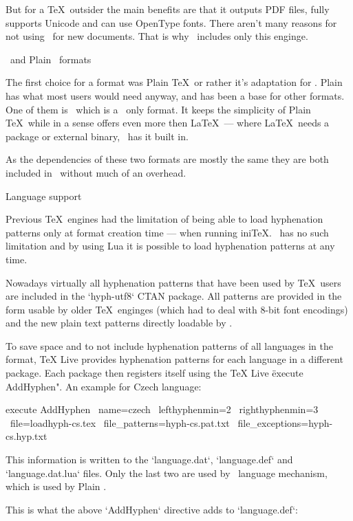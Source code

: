 But for a \TeX\ outsider the main benefits are that it outputs PDF files, fully
supports Unicode and can use OpenType fonts. There aren't many reasons for not
using \LuaTeX\ for new documents. That is why \MMTeX\ includes only this
enginge.

\sec \OpTeX\ and Plain \LuaTeX\ formats

The first choice for a format was Plain \TeX\ or rather it's adaptation for
\LuaTeX. Plain has what most users would need anyway, and has been a base for
other formats. One of them is \OpTeX\ which is a \LuaTeX\ only format. It keeps
the simplicity of Plain \TeX\ while in a sense offers even more then \LaTeX\
--- where \LaTeX\ needs a package or external binary, \OpTeX\ has it built in.

As the dependencies of these two formats are mostly the same they are both
included in \MMTeX\ without much of an overhead.

\sec Language support

Previous \TeX\ engines had the limitation of being able to load hyphenation
patterns only at format creation time --- when running ini\TeX. \LuaTeX\ has no
such limitation and by using Lua it is possible to load hyphenation patterns at
any time.

Nowadays virtually all hyphenation patterns that have been used by \TeX\ users
are included in the `hyph-utf8` CTAN package. All patterns are provided in the
form usable by older \TeX\ enginges (which had to deal with 8-bit font
encodings) and the new plain text patterns directly loadable by \LuaTeX.

To save space and to not include hyphenation patterns of all languages in the
format, TeX Live provides hyphenation patterns for each language in a different
package. Each package then registers itself using the TeX Live \"execute
AddHyphen". An example for Czech language:

\begtt
execute AddHyphen \
	name=czech \
	lefthyphenmin=2 \
	righthyphenmin=3 \
	file=loadhyph-cs.tex \
	file_patterns=hyph-cs.pat.txt \
	file_exceptions=hyph-cs.hyp.txt
\endtt

This information is written to the `language.dat`, `language.def` and
`language.dat.lua` files. Only the last two are used by \eTeX\ language
mechanism, which is used by Plain \LuaTeX.

This is what the above `AddHyphen` directive adds to `language.def`:

\begtt
\addlanguage{czech}{loadhyph-cs.tex}{}{2}{3}
\endtt

